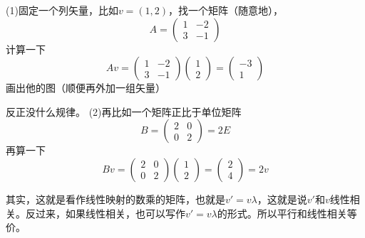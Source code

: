 \documentclass[11pt,a4paper,openany]{book}%
\theoremstyle{plain}%
\begin{document}
(1)固定一个列矢量，比如$v=(1,2)$，找一个矩阵（随意地），
\[
A=\begin{pmatrix}
1&-2\\
3&-1
\end{pmatrix}
\]
计算一下
\[
Av=\begin{pmatrix}
1&-2\\
3&-1
\end{pmatrix}
\begin{pmatrix}
1\\
2
\end{pmatrix}
=
\begin{pmatrix}
-3\\
1
\end{pmatrix}
\]
画出他的图（顺便再外加一组矢量）
\begin{center}
\end{center}
反正没什么规律。
(2)再比如一个矩阵正比于单位矩阵
\[
B=\begin{pmatrix}
2&0\\
0&2
\end{pmatrix}
=2E
\]
再算一下
\[
Bv=\begin{pmatrix}
2&0\\
0&2
\end{pmatrix}
\begin{pmatrix}
1\\
2
\end{pmatrix}
=
\begin{pmatrix}
2\\
4
\end{pmatrix}
=2v
\]

其实，这就是看作线性映射的数乘的矩阵，也就是$v'=v \lambda$，这就是说$v'$和$v$线性相关。反过来，如果线性相关，也可以写作$v'=v \lambda$的形式。所以平行和线性相关等价。
\end{document}
